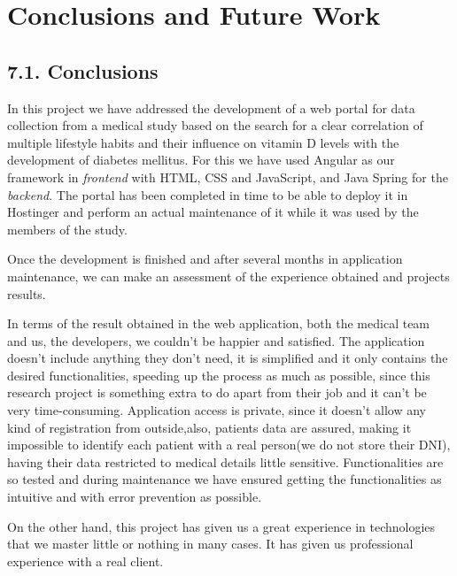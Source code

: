 \chapter*{Conclusions and Future Work}

\section*{7.1. Conclusions}
    In this project we have addressed the development of a web portal for data collection from a medical study based on the search for a clear correlation of multiple lifestyle habits and their influence on vitamin D levels with the development of diabetes mellitus. For this we have used Angular as our framework in \textit{frontend} with HTML, CSS and JavaScript, and Java Spring for the \textit{backend}. The portal has been completed in time to be able to deploy it in Hostinger and perform an actual maintenance of it while it was used by the members of the study.\newline

    Once the development is finished and after several months in application maintenance, we can make an assessment of the experience obtained  and projects results. \newline

    In terms of the result obtained in the web application, both the medical team and us, the developers, we couldn't be happier and satisfied. The application doesn't include anything they don't need, it is simplified and it only contains the desired functionalities, speeding up the process as much as possible, since this research project is something extra to do apart from their job and it can't be very time-consuming. Application access is private, since it doesn't allow any kind of registration from outside,also, patients data are assured, making it impossible to identify each patient with a real person(we do not store their DNI), having their data restricted  to medical details little sensitive. Functionalities are so tested and during maintenance we have ensured getting the functionalities as intuitive and with error prevention as possible. \newline
    
    On the other hand, this project has given us a great experience in technologies that we master little or nothing in many cases. It has given us professional experience with a real client. \newline
    
